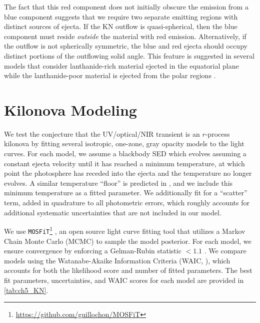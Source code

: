 The fact that this red component does not initially obscure the emission from a blue component suggests that we require two separate emitting regions with distinct sources of ejecta. If the KN outflow is quasi-spherical, then the blue component must reside {\it outside} the material with red emission.  Alternatively, if the outflow is not spherically symmetric, the blue and red ejecta should occupy distinct portions of the outflowing solid angle. This feature is suggested in several models that consider lanthanide-rich material ejected in the equatorial plane while the lanthanide-poor material is ejected from the polar regions \citep{Kasen+15,Metzger2017}.

\section{Kilonova Modeling}
\label{sec:ch5_models}

We test the conjecture that the UV/optical/NIR transient is an $r$-process kilonova by fitting several isotropic, one-zone, gray opacity models to the light curves. For each model, we assume a blackbody SED which evolves assuming a constant ejecta velocity until it has reached a minimum temperature, at which point the photosphere has receded into the ejecta and the temperature no longer evolves. A similar temperature ``floor'' is predicted in \cite{BarnesKasen13}, and we include this minimum temperature as a fitted parameter.  We additionally fit for a ``scatter'' term, added in quadrature to all photometric errors, which roughly accounts for additional systematic uncertainties that are not included in our model.

We use {\tt MOSFiT}\footnote{\singlespace \url{https://github.com/guillochon/MOSFiT}} \citep{Guillochon+17b,Nicholl+17b}, an open source light curve fitting tool that utilizes a Markov Chain Monte Carlo (MCMC) to sample the model posterior. For each model, we ensure convergence by enforcing a Gelman-Rubin statistic $<1.1$ \citep{GelmanRubin92}.  We compare models using the Watanabe-Akaike Information Criteria (WAIC, \citealt{Watanabe2010,Gelman+14}), which accounts for both the likelihood score and number of fitted parameters. The best fit parameters, uncertainties, and WAIC scores for each model are provided in \cref{tab:ch5_KN}.

